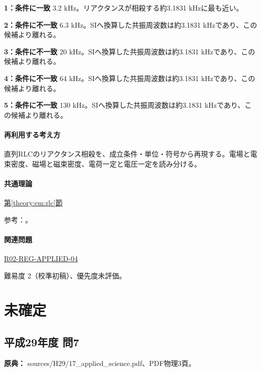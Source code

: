 \noindent\textbf{1：条件に一致} 3.2 kHz。リアクタンスが相殺する約3.1831 kHzに最も近い。\par

\noindent\textbf{2：条件に不一致} 6.3 kHz。SIへ換算した共振周波数は約3.1831 kHzであり、この候補より離れる。\par

\noindent\textbf{3：条件に不一致} 20 kHz。SIへ換算した共振周波数は約3.1831 kHzであり、この候補より離れる。\par

\noindent\textbf{4：条件に不一致} 64 kHz。SIへ換算した共振周波数は約3.1831 kHzであり、この候補より離れる。\par

\noindent\textbf{5：条件に不一致} 130 kHz。SIへ換算した共振周波数は約3.1831 kHzであり、この候補より離れる。\par

\paragraph{再利用する考え方} 直列RLCのリアクタンス相殺を、成立条件・単位・符号から再現する。電場と電束密度、磁場と磁束密度、電荷一定と電圧一定を読み分ける。

\paragraph{共通理論} \hyperref[theory:em:rlc]{第\ref*{theory:em:rlc}節}

\par 参考：\cite{mit_em12}。

\paragraph{関連問題} \hyperref[q:r02-reg-applied-04]{R02-REG-APPLIED-04}

\par 難易度 2（校準初稿）、優先度未評価。

\section{未確定}

\subsection{平成29年度 問7}
\label{q:h29-reg-applied-07}

\noindent\textbf{原典：} sources/H29/17\_applied\_science.pdf、PDF物理3頁。

